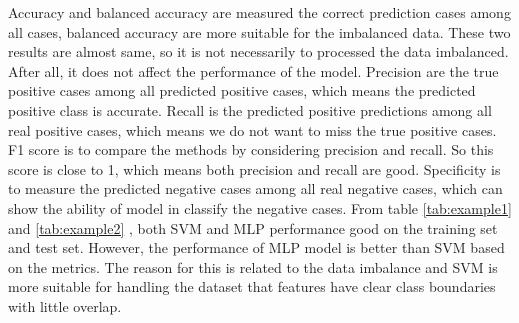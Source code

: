 Accuracy and balanced accuracy are measured the correct prediction cases among all cases, balanced accuracy are more suitable for the imbalanced data. These two results are almost same, so it is not necessarily to processed the data imbalanced. After all, it does not affect the performance of the model. 
Precision are the true positive cases among all predicted positive cases, which means the predicted positive class is accurate. 
Recall is the predicted positive predictions among all real positive cases, which means we do not want to miss the true positive cases. 
F1 score is to compare the methods by considering precision and recall. So this score is close to 1, which means both precision and recall are good.   
Specificity is to measure the predicted negative cases among all real negative cases, which can show the ability of model in classify the negative cases. 
From table \ref{tab:example1} and \ref{tab:example2} , both SVM and MLP performance good on the training set and test set. However, the performance of MLP model is better than SVM based on the metrics. The reason for this is related to the data imbalance and SVM is more suitable for handling the dataset that features have clear class boundaries with little overlap.





